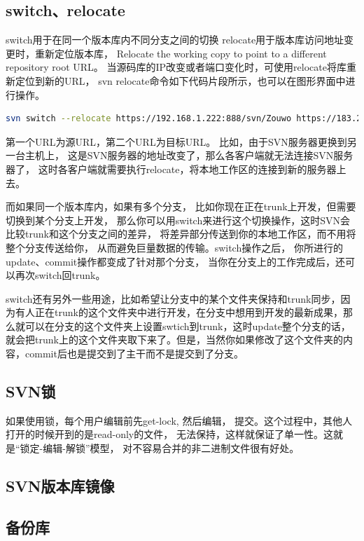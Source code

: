 \documentclass{book}
\begin{document}
\subsection{switch、relocate}

switch用于在同一个版本库内不同分支之间的切换
relocate用于版本库访问地址变更时，重新定位版本库，
Relocate the working copy to point to a different repository root URL。
当源码库的IP改变或者端口变化时，可使用relocate将库重新定位到新的URL，
svn relocate命令如下代码片段所示，也可以在图形界面中进行操作。

\begin{lstlisting}[language=Bash]
svn switch --relocate https://192.168.1.222:888/svn/Zouwo https://183.230.47.195:888/svn/Zouwo
\end{lstlisting}

第一个URL为源URL，第二个URL为目标URL。
比如，由于SVN服务器更换到另一台主机上，
这是SVN服务器的地址改变了，那么各客户端就无法连接SVN服务器了，
这时各客户端就需要执行relocate，将本地工作区的连接到新的服务器上去。

而如果同一个版本库内，如果有多个分支，
比如你现在正在trunk上开发，但需要切换到某个分支上开发，
那么你可以用switch来进行这个切换操作，这时SVN会比较trunk和这个分支之间的差异，
将差异部分传送到你的本地工作区，而不用将整个分支传送给你，
从而避免巨量数据的传输。switch操作之后，
你所进行的update、commit操作都变成了针对那个分支，
当你在分支上的工作完成后，还可以再次switch回trunk。 

switch还有另外一些用途，比如希望让分支中的某个文件夹保持和trunk同步，因为有人正在trunk的这个文件夹中进行开发，在分支中想用到开发的最新成果，那么就可以在分支的这个文件夹上设置swtich到trunk，这时update整个分支的话，就会把trunk上的这个文件夹取下来了。但是，当然你如果修改了这个文件夹的内容，commit后也是提交到了主干而不是提交到了分支。

\subsection{SVN锁}

如果使用锁，每个用户编辑前先get-lock, 然后编辑，
提交。这个过程中，其他人打开的时候开到的是read-only的文件，
无法保持，这样就保证了单一性。这就是“锁定-编辑-解锁”模型，
对不容易合并的非二进制文件很有好处。

\subsection{SVN版本库镜像}

\subsection{备份库}
\end{document}
